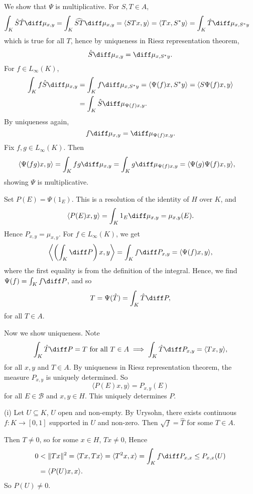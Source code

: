 \documentclass[12pt]{article}
\begin{document}
\begin{proofbox}
	We show that $\Psi$ is multiplicative. For $S, T \in A$,
	\begin{align*}
		\int_K \hat S \hat T \diff \mu_{x,y} &= \int_K \widehat{ST} \diff \mu_{x, y} = \langle S T x, y \rangle = \langle T x, S^{\ast} y\rangle = \int_K \hat T \diff \mu_{x, S^{\ast} y}
	\end{align*}
	which is true for all $T$, hence by uniqueness in Riesz representation theorem,
	\[
	\hat S \diff \mu_{x, y} = \diff \mu_{x, S^{\ast} y}.
	\]
	For $f \in L_\infty(K)$,
	\begin{align*}
		\int_K f \hat S \diff \mu_{x, y} &= \int_K f \diff \mu_{x, S^{\ast} y} = \langle \Psi(f) x, S^{\ast} y \rangle = \langle S \Psi(f) x, y \rangle \\
						 &= \int_K \hat S \diff \mu_{\Psi(f) x, y}.
	\end{align*}
	By uniqueness again, 
	\[
	f \diff \mu_{x, y} = \diff \mu_{\Psi(f) x, y}.
	\]
	Fix $f, g \in L_\infty(K)$. Then
	\begin{align*}
		\langle \Psi(fg) x, y\rangle &= \int_K fg \diff \mu_{x, y} = \int_K g \diff \mu_{\Psi(f) x, y} = \langle\Psi(g) \Psi(f) x, y\rangle,
	\end{align*}
	showing $\Psi$ is multiplicative.

	Set $P(E) = \Psi(1_E)$. This is a resolution of the identity of $H$ over $K$, and
	\[
	\langle P(E) x, y \rangle = \int_K 1_E \diff \mu_{x, y} = \mu_{x, y}(E).
	\]
	Hence $P_{x, y} = \mu_{x, y}$. For $f \in L_\infty(K)$, we get
	\[
	\left\langle \left( \int_K  \diff P \right) x, y \right\rangle = \int_K f \diff P_{x, y} = \langle \Psi(f) x, y \rangle,
	\]
	where the first equality is from the definition of the integral. Hence, we find $\Psi(f) = \int_K f \diff P$, and so
	\[
	T = \Psi(\hat T) = \int_K \hat T \diff P,
	\]
	for all $T \in A$.

	Now we show uniqueness. Note
	\[
		\int_K \hat T \diff P = T \text{ for all } T \in A \implies \int_K \hat T \diff P_{x, y} = \langle Tx, y\rangle,
	\]
	for all $x, y$ and $T \in A$. By uniqueness in Riesz representation theorem, the measure $P_{x, y}$ is uniquely determined. So
	\[
	\langle P(E) x, y \rangle = P_{x, y}(E)
	\]
	for all $E \in \mathcal{B}$ and $x, y \in H$. This uniquely determines $P$.

	(i) Let $U \subseteq K$, $U$ open and non-empty. By Urysohn, there exists continuous $f : K \to [0, 1]$ supported in $U$ and non-zero. Then $\sqrt f = \hat T$ for some $T \in A$.

	Then $T \neq 0$, so for some $x \in H$, $Tx \neq 0$, Hence
	\begin{align*}
		0 &< \|Tx\|^2 = \langle Tx, Tx \rangle = \langle T^2 x, x \rangle = \int_K f \diff P_{x, x} \leq P_{x, x}(U) \\
		  &= \langle P(U) x, x\rangle.
	\end{align*}
	So $P(U) \neq 0$.


\end{proofbox}
\end{document}

